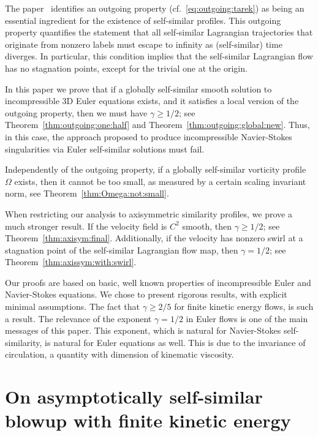 \documentclass[11pt,reqno]{amsproc}
\numberwithin{equation}{section}
\theoremstyle{remark}
\begin{document}
The paper~\cite{Elgindi25} identifies an outgoing property (cf.~\eqref{eq:outgoing:tarek}) as being an essential ingredient for the existence of self-similar profiles. This outgoing property quantifies the statement that all self-similar Lagrangian trajectories that originate from nonzero labels must escape to infinity as (self-similar) time diverges. In particular, this condition implies that the self-similar Lagrangian flow has no stagnation points, except for the trivial one at the origin.   

In this paper we prove that if a globally self-similar smooth solution to incompressible 3D Euler equations exists, and it satisfies a local version of the outgoing property, then we must have $\gamma \geq 1/2$; see Theorem~\ref{thm:outgoing:one:half} and Theorem~\ref{thm:outgoing:global:new}. Thus, in this case, the approach proposed to produce incompressible Navier-Stokes singularities via Euler self-similar solutions must fail.

Independently of the outgoing property, if a globally self-similar vorticity profile $\Omega$ exists, then it cannot be too small, as measured by a certain scaling invariant norm, see Theorem~\ref{thm:Omega:not:small}. 

When restricting our analysis to axisymmetric similarity profiles, we prove a much stronger result. If the velocity field is $C^2$ smooth, then $\gamma \geq 1/2$; see Theorem~\ref{thm:axisym:final}. Additionally, if the velocity has nonzero swirl at a stagnation point of the self-similar Lagrangian flow map, then $\gamma=1/2$; see Theorem~\ref{thm:axissym:with:swirl}.

Our proofs are based on basic, well known properties of incompressible Euler and Navier-Stokes equations. We chose to present rigorous results, with explicit minimal assumptions. The fact that $\gamma\ge 2/5$ for finite kinetic energy flows, is such a result. The relevance of the exponent $\gamma= 1/2$ in Euler flows is  one of the main messages of this paper. This exponent, which is natural for Navier-Stokes self-similarity, is natural for Euler equations as well. This is due to the invariance of circulation, a quantity with dimension of kinematic viscosity.

 
\section{On asymptotically self-similar blowup with finite kinetic energy}
\label{sec:two:fifths}
\end{document}
